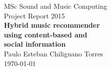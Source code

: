 \documentclass[a4paper,12pt,times]{report}
\begin{document}
\begin{minipage}[t]{0.60\textwidth}	
	{\normalsize MSc Sound and Music Computing}\\
	{\normalsize Project Report 2015}\vspace{5.5cm}\\
	\textbf{\Large Hybrid music recommender\\using content-based and\\social information}\newline\\%
	{\large Paulo Esteban Chiliguano Torres}\vspace{7cm}\\%
	\flushright
	{\normalsize \today}%

\end{minipage}











\tableofcontents
\listoffigures
\listoftables











%
\printbibliography[title=References]

\end{document}
